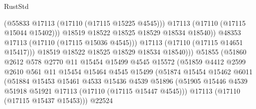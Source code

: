 \begin{lexlean}{RustStd}
\begin{coremodule}
                                          (@55833 @17113 (@17110 (@17115 @15225 @4545)))
                                          @17113
                                          (@17110 (@17115 @15044 @15402)))
                                        @18519
                                        @18522
                                        @18525
                                        @18529
                                        @18534
                                        @18540))
                                    @48353
                                    @17113
                                    (@17110 (@17115 @15036 @4545)))
                                  @17113
                                  (@17110 (@17115 @14651 @15417)))
                                @18519
                                @18522
                                @18525
                                @18529
                                @18534
                                @18540)))
                          @51855
                          (@51860
                            @2612
                            @578
                            @2770
                            @11
                            @15454
                            @15499
                            @4545
                            @15572
                            (@51859
                              @4412
                              @2599
                              @2610
                              @561
                              @11
                              @15454
                              @15464
                              @4545
                              @15499
                              (@51874
                                @15454
                                @15462
                                @6011
                                (@51884
                                  @15453
                                  @15461
                                  @4533
                                  @15436
                                  @4539
                                  @51896
                                  (@51905
                                    @15446
                                    @4539
                                    @51918
                                    @51921
                                    @17113
                                    (@17110 (@17115 @15447 @4545)))
                                  @17113
                                  (@17110 (@17115 @15437 @15453)))
                                @22524

\end{coremodule}
\end{lexlean}
